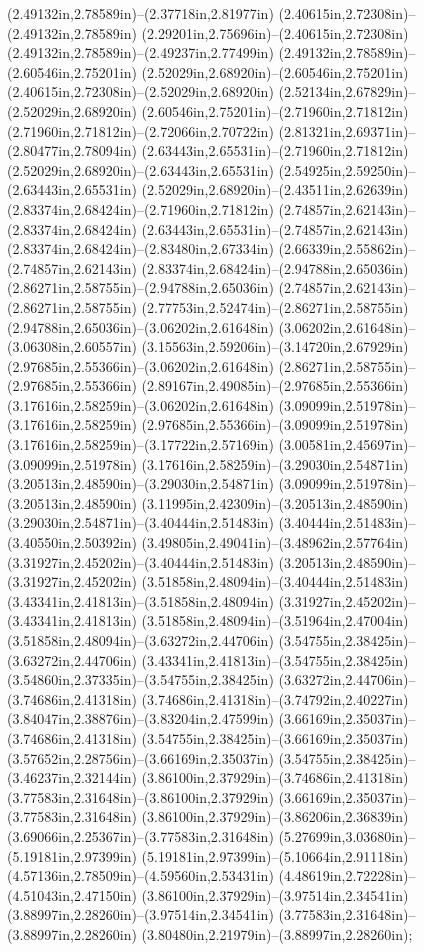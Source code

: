 (2.49132in,2.78589in)--(2.37718in,2.81977in) (2.40615in,2.72308in)--(2.49132in,2.78589in) (2.29201in,2.75696in)--(2.40615in,2.72308in) (2.49132in,2.78589in)--(2.49237in,2.77499in) (2.49132in,2.78589in)--(2.60546in,2.75201in) (2.52029in,2.68920in)--(2.60546in,2.75201in) (2.40615in,2.72308in)--(2.52029in,2.68920in) (2.52134in,2.67829in)--(2.52029in,2.68920in) (2.60546in,2.75201in)--(2.71960in,2.71812in) (2.71960in,2.71812in)--(2.72066in,2.70722in) (2.81321in,2.69371in)--(2.80477in,2.78094in) (2.63443in,2.65531in)--(2.71960in,2.71812in) (2.52029in,2.68920in)--(2.63443in,2.65531in) (2.54925in,2.59250in)--(2.63443in,2.65531in) (2.52029in,2.68920in)--(2.43511in,2.62639in) (2.83374in,2.68424in)--(2.71960in,2.71812in) (2.74857in,2.62143in)--(2.83374in,2.68424in) (2.63443in,2.65531in)--(2.74857in,2.62143in) (2.83374in,2.68424in)--(2.83480in,2.67334in) (2.66339in,2.55862in)--(2.74857in,2.62143in) (2.83374in,2.68424in)--(2.94788in,2.65036in) (2.86271in,2.58755in)--(2.94788in,2.65036in) (2.74857in,2.62143in)--(2.86271in,2.58755in) (2.77753in,2.52474in)--(2.86271in,2.58755in) (2.94788in,2.65036in)--(3.06202in,2.61648in) (3.06202in,2.61648in)--(3.06308in,2.60557in) (3.15563in,2.59206in)--(3.14720in,2.67929in) (2.97685in,2.55366in)--(3.06202in,2.61648in) (2.86271in,2.58755in)--(2.97685in,2.55366in) (2.89167in,2.49085in)--(2.97685in,2.55366in) (3.17616in,2.58259in)--(3.06202in,2.61648in) (3.09099in,2.51978in)--(3.17616in,2.58259in) (2.97685in,2.55366in)--(3.09099in,2.51978in) (3.17616in,2.58259in)--(3.17722in,2.57169in) (3.00581in,2.45697in)--(3.09099in,2.51978in) (3.17616in,2.58259in)--(3.29030in,2.54871in) (3.20513in,2.48590in)--(3.29030in,2.54871in) (3.09099in,2.51978in)--(3.20513in,2.48590in) (3.11995in,2.42309in)--(3.20513in,2.48590in) (3.29030in,2.54871in)--(3.40444in,2.51483in) (3.40444in,2.51483in)--(3.40550in,2.50392in) (3.49805in,2.49041in)--(3.48962in,2.57764in) (3.31927in,2.45202in)--(3.40444in,2.51483in) (3.20513in,2.48590in)--(3.31927in,2.45202in) (3.51858in,2.48094in)--(3.40444in,2.51483in) (3.43341in,2.41813in)--(3.51858in,2.48094in) (3.31927in,2.45202in)--(3.43341in,2.41813in) (3.51858in,2.48094in)--(3.51964in,2.47004in) (3.51858in,2.48094in)--(3.63272in,2.44706in) (3.54755in,2.38425in)--(3.63272in,2.44706in) (3.43341in,2.41813in)--(3.54755in,2.38425in) (3.54860in,2.37335in)--(3.54755in,2.38425in) (3.63272in,2.44706in)--(3.74686in,2.41318in) (3.74686in,2.41318in)--(3.74792in,2.40227in) (3.84047in,2.38876in)--(3.83204in,2.47599in) (3.66169in,2.35037in)--(3.74686in,2.41318in) (3.54755in,2.38425in)--(3.66169in,2.35037in) (3.57652in,2.28756in)--(3.66169in,2.35037in) (3.54755in,2.38425in)--(3.46237in,2.32144in) (3.86100in,2.37929in)--(3.74686in,2.41318in) (3.77583in,2.31648in)--(3.86100in,2.37929in) (3.66169in,2.35037in)--(3.77583in,2.31648in) (3.86100in,2.37929in)--(3.86206in,2.36839in) (3.69066in,2.25367in)--(3.77583in,2.31648in) (5.27699in,3.03680in)--(5.19181in,2.97399in) (5.19181in,2.97399in)--(5.10664in,2.91118in) (4.57136in,2.78509in)--(4.59560in,2.53431in) (4.48619in,2.72228in)--(4.51043in,2.47150in) (3.86100in,2.37929in)--(3.97514in,2.34541in) (3.88997in,2.28260in)--(3.97514in,2.34541in) (3.77583in,2.31648in)--(3.88997in,2.28260in) (3.80480in,2.21979in)--(3.88997in,2.28260in);
